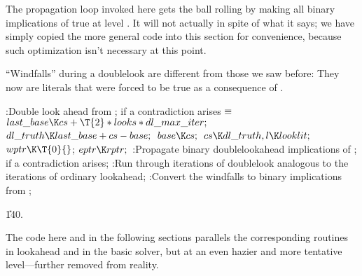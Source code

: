 The propagation loop invoked here gets the ball rolling by making all
binary implications of  true at level . It
will
not actually  in spite of what it says; we have
simply copied the more general code into this section for convenience,
because such optimization isn't necessary at this point.

``Windfalls'' during a doublelook are different from those we saw before:
They now are literals that were forced to be true as a consequence
of .

\Y\B\4:Double look ahead from ; 
if a contradiction arises\X${}\equiv{}$\6
$\\{last\_base}\K\\{cs}+\T{2}*\\{looks}*\\{dl\_max\_iter};{}$\6
${}\\{dl\_truth}\K\\{last\_base}+\\{cs}-\\{base};{}$\6
${}\\{base}\K\\{cs};{}$\6
${}\\{cs}\K\\{dl\_truth},\39\|l\K\\{looklit};{}$\6
${}\\{wptr}\K\T{0}{}$;\5
${}\\{eptr}\K\\{rptr};{}$\6
:Propagate binary doublelookahead implications of ;  if a contradiction arises\X;\6
:Run through iterations of doublelook analogous to the iterations of
ordinary lookahead\X;\6
:Convert the windfalls to binary implications from \X;\par
\U140.\fi

The code here and in the following sections parallels the corresponding
routines in lookahead and in the basic solver, but at an even hazier and more
tentative level---further removed from reality.

